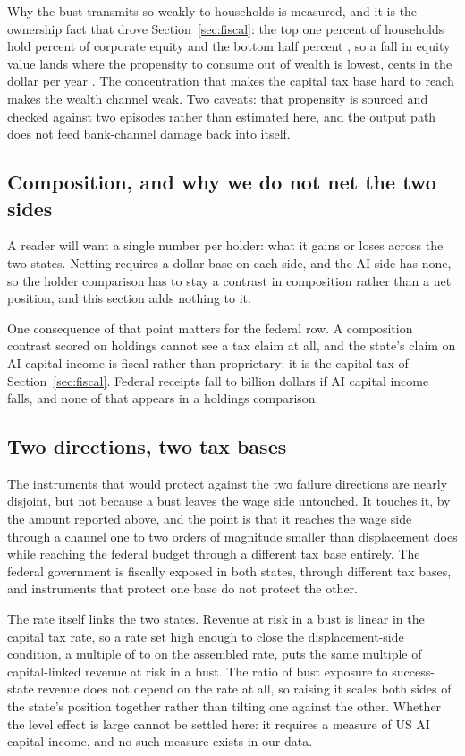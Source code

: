 Why the bust transmits so weakly to households is measured, and it is the ownership fact that drove
Section~\ref{sec:fiscal}: the top one percent of households hold  percent
of corporate equity and the bottom half  percent \citep{FRBDFA}, so a
fall in equity value lands where the propensity to consume out of wealth is lowest,
 cents in the dollar per year \citep{ChodorowReichNenovSimsek2021}. The
concentration that makes the capital tax base hard to reach makes the wealth channel weak. Two
caveats: that propensity is sourced and checked against two episodes rather than estimated here,
and the output path does not feed bank-channel damage back into itself.

\subsection{Composition, and why we do not net the two sides}

A reader will want a single number per holder: what it gains or loses across the two states.
Netting requires a dollar base on each side, and the AI side has none, so the holder comparison has to stay a contrast in composition rather than a net position, and this section adds nothing to it.

One consequence of that point matters for the federal row. A
composition contrast scored on holdings cannot see a tax claim at all, and the state's claim on AI
capital income is fiscal rather than proprietary: it is the capital tax of
Section~\ref{sec:fiscal}. Federal receipts fall  to
 billion dollars if AI capital income falls, and none of that appears in
a holdings comparison.

\subsection{Two directions, two tax bases}

The instruments that would protect against the two failure directions are nearly disjoint, but not
because a bust leaves the wage side untouched. It touches it, by the amount reported above, and
the point is that it reaches the wage side through a channel one to two orders of magnitude
smaller than displacement does while reaching the federal budget through a different tax base
entirely. The federal government is fiscally exposed in both states, through different tax bases,
and instruments that protect one base do not protect the other.

The rate itself links the two states. Revenue at risk in a bust is linear in the capital tax rate,
so a rate set high enough to close the displacement-side condition, a multiple of
 to  on the assembled rate, puts the same
multiple of capital-linked revenue at risk in a bust. The ratio of bust exposure to success-state
revenue does not depend on the rate at all, so raising it scales both sides of the state's
position together rather than tilting one against the other. Whether the level effect is large
cannot be settled here: it requires a measure of US AI capital income, and no such measure exists
in our data.

